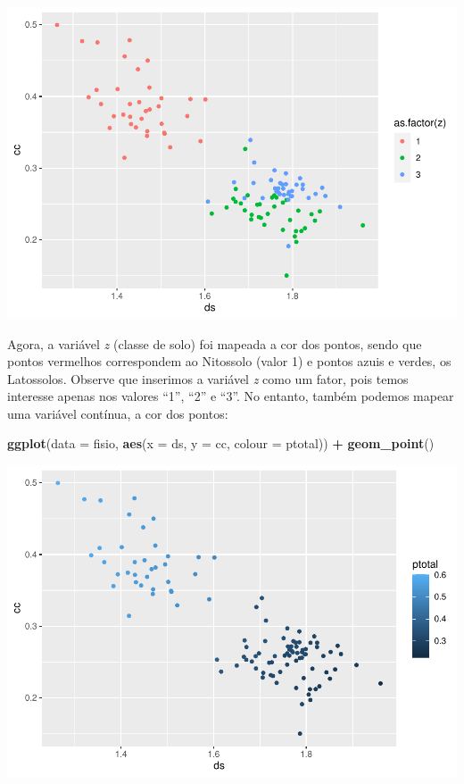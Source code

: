 \documentclass[
]{book}
\newenvironment{Shaded}{\begin{snugshade}}{\end{snugshade}}
\newcommand{\DataTypeTok}[1]{\textcolor[rgb]{0.13,0.29,0.53}{#1}}
\newcommand{\KeywordTok}[1]{\textcolor[rgb]{0.13,0.29,0.53}{\textbf{#1}}}
\newcommand{\NormalTok}[1]{#1}
\newcommand{\OperatorTok}[1]{\textcolor[rgb]{0.81,0.36,0.00}{\textbf{#1}}}
\newcommand{\StringTok}[1]{\textcolor[rgb]{0.31,0.60,0.02}{#1}}
\begin{document}
\includegraphics{TudodoR_files/figure-latex/unnamed-chunk-187-1.pdf}

Agora, a variável \emph{z} (classe de solo) foi mapeada a cor dos pontos, sendo que pontos vermelhos correspondem ao Nitossolo (valor 1) e pontos azuis e verdes, os Latossolos. Observe que inserimos a variável \emph{z} como um fator, pois temos interesse apenas nos valores ``1'', ``2'' e ``3''. No entanto, também podemos mapear uma variável contínua, a cor dos pontos:

\begin{Shaded}
\begin{Highlighting}[]
\KeywordTok{ggplot}\NormalTok{(}\DataTypeTok{data =}\NormalTok{ fisio, }\KeywordTok{aes}\NormalTok{(}\DataTypeTok{x =}\NormalTok{ ds, }\DataTypeTok{y =}\NormalTok{ cc, }\DataTypeTok{colour =}\NormalTok{ ptotal)) }\OperatorTok{+}
\StringTok{  }\KeywordTok{geom_point}\NormalTok{()}
\end{Highlighting}
\end{Shaded}

\includegraphics{TudodoR_files/figure-latex/unnamed-chunk-188-1.pdf}
\end{document}
